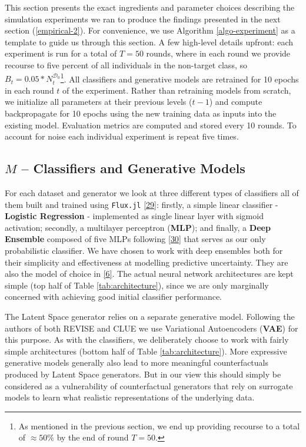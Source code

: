 \documentclass[conference,final,]{IEEEtran}
\theoremstyle{definition}
\theoremstyle{definition}
\theoremstyle{definition}
\theoremstyle{definition}
\theoremstyle{remark}
\begin{document}
This section presents the exact ingredients and parameter choices describing the simulation experiments we ran to produce the findings presented in the next section (\ref{empirical-2}). For convenience, we use Algorithm \ref{algo-experiment} as a template to guide us through this section. A few high-level details upfront: each experiment is run for a total of \(T=50\) rounds, where in each round we provide recourse to five percent of all individuals in the non-target class, so \(B_t=0.05 * N_t^{\mathcal{D}_0}\)\footnote{As mentioned in the previous section, we end up providing recourse to a total of \(\approx50\%\) by the end of round \(T=50\).}. All classifiers and generative models are retrained for 10 epochs in each round \(t\) of the experiment. Rather than retraining models from scratch, we initialize all parameters at their previous levels (\(t-1\)) and compute backpropagate for 10 epochs using the new training data as inputs into the existing model. Evaluation metrics are computed and stored every 10 rounds. To account for noise each individual experiment is repeat five times.

\hypertarget{empirical-classifiers}{%
\subsection{\texorpdfstring{\(M\) -- Classifiers and Generative Models}{M -- Classifiers and Generative Models}}\label{empirical-classifiers}}

For each dataset and generator we look at three different types of classifiers all of them built and trained using \texttt{Flux.jl} \protect\hyperlink{ref-innes2018fashionable}{{[}29{]}}: firstly, a simple linear classifier - \textbf{Logistic Regression} - implemented as single linear layer with sigmoid activation; secondly, a multilayer perceptron (\textbf{MLP}); and finally, a \textbf{Deep Ensemble} composed of five MLPs following \protect\hyperlink{ref-lakshminarayanan2016simple}{{[}30{]}} that serves as our only probabilistic classifier. We have chosen to work with deep ensembles both for their simplicity and effectiveness at modelling predictive uncertainty. They are also the model of choice in \protect\hyperlink{ref-schut2021generating}{{[}6{]}}. The actual neural network architectures are kept simple (top half of Table \ref{tab:architecture}), since we are only marginally concerned with achieving good initial classifier performance.

The Latent Space generator relies on a separate generative model. Following the authors of both REVISE and CLUE we use Variational Autoencoders (\textbf{VAE}) for this purpose. As with the classifiers, we deliberately choose to work with fairly simple architectures (bottom half of Table \ref{tab:architecture}). More expressive generative models generally also lead to more meaningful counterfactuals produced by Latent Space generators. But in our view this should simply be considered as a vulnerability of counterfactual generators that rely on surrogate models to learn what realistic representations of the underlying data.
\end{document}
